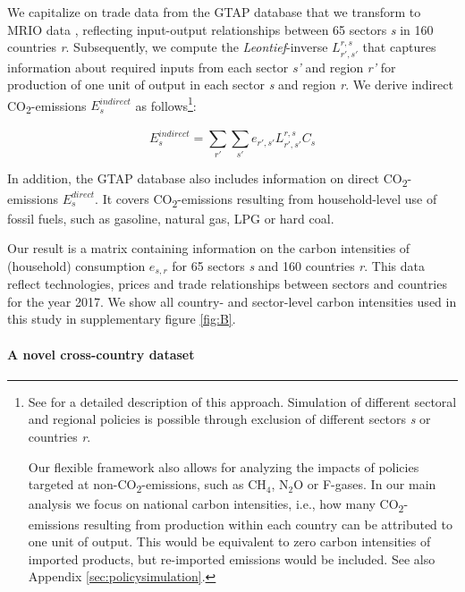 \documentclass[12pt, a4paper]{article}
\begin{document}
We capitalize on trade data from the GTAP database \autocite[Version 11B, ][]{Aguiar.2022} that we transform to MRIO data \autocite{Peters.2011}, reflecting input-output relationships between 65 sectors \textit{s} in 160 countries \textit{r}. Subsequently, we compute the \textit{Leontief}-inverse $L_{r',s'}^{r,s}$ that captures information about required inputs from each sector \textit{s'} and region \textit{r'} for production of one unit of output in each sector \textit{s} and region \textit{r}. We derive indirect CO\textsubscript{2}-emissions $E_{s}^{indirect}$ as follows\footnote{See \textcite{Missbach.2024, Steckel.2021b,Feindt.2021,VogtSchilb.2019} for a detailed description of this approach. Simulation of different sectoral and regional policies is possible through exclusion of different sectors \textit{s} or countries \textit{r}. 

Our flexible framework also allows for analyzing the impacts of policies targeted at non-CO\textsubscript{2}-emissions, such as CH$_{4}$, N$_{2}$O or F-gases. In our main analysis we focus on national carbon intensities, i.e., how many CO\textsubscript{2}-emissions resulting from production within each country can be attributed to one unit of output. This would be equivalent to zero carbon intensities of imported products, but re-imported emissions would be included. See also Appendix \ref{sec:policysimulation}.}:

\begin{equation}
    E_{s}^{indirect} = \sum_{r'} \sum_{s'} e_{r',s'} L_{r',s'}^{r,s} C_{s}
\end{equation}

In addition, the GTAP database also includes information on direct CO\textsubscript{2}-emissions $E_{s}^{direct}$. It covers CO\textsubscript{2}-emissions resulting from household-level use of fossil fuels, such as gasoline, natural gas, LPG or hard coal.

Our result is a matrix containing information on the carbon intensities of (household) consumption $e_{s,r}$ for 65 sectors \textit{s} and 160 countries \textit{r}. This data reflect technologies, prices and trade relationships between sectors and countries for the year 2017. We show all country- and sector-level carbon intensities used in this study in supplementary figure \ref{fig:B}.

\paragraph{A novel cross-country dataset} 
\end{document}

